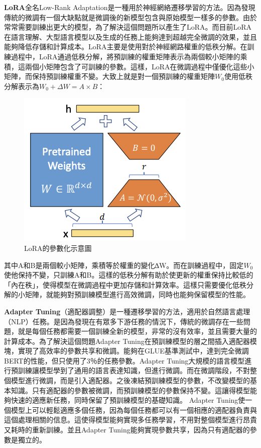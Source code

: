 \documentclass[8pt,a4paper,MingLiU,UTF8]{article}
\begin{document}
	\textbf{LoRA}全名Low-Rank Adaptation是一種用於神經網絡遷移學習的方法。因為發現傳統的微調有一個大缺點就是微調後的新模型包含與原始模型一樣多的參數。由於常常需要訓練出更大的模型，為了解決這個問題所以產生了LoRA。而目前LoRA在語言理解、大型語言模型以及生成的任務上能夠達到超越完全微調的效果，並且能夠降低存儲和計算成本。LoRA主要是使用對於神經網路權重的低秩分解。在訓練過程中，LoRA通過低秩分解，將預訓練的權重矩陣表示為兩個較小矩陣的乘積，這兩個小矩陣包含了可訓練的參數。這樣，LoRA在微調過程中僅優化這些小矩陣，而保持預訓練權重不變。大致上就是對一個預訓練的權重矩陣$W_0$使用低秩分解表示為$W_0+\Delta W=A×B$：
	\begin{figure}[H]
		\centering
	\includegraphics{20120468S5MbIQ5N0s}
	\caption{LoRA的參數化示意圖\protect\cite{hu2021lora}}
	\end{figure}
	其中A和B是兩個較小矩陣，乘積等於權重的變化∆W。而在訓練過程中，固定$W_0$使他保持不變，只訓練A和B。這樣的低秩分解有助於使更新的權重保持比較低的「內在秩」，使得模型在微調過程中更加存儲和計算效率。這樣只需要優化低秩分解的小矩陣，就能夠對預訓練模型進行高效微調，同時也能夠保留模型的性能。\cite{hu2021lora}

	\textbf{Adapter Tuning}（適配器調整）是一種遷移學習的方法，適用於自然語言處理（NLP）任務。是因為發現在有眾多下游任務的情況下，傳統的微調存在一些問題，就是每個任務都需要一個訓練全新的模型，非常的沒有效率，並且需要大量的計算成本。為了解決這個問題Adapter Tuning在預訓練模型的層之間插入適配器模塊，實現了高效率的參數共享和微調。能夠在GLUE基準測試中，達到完全微調BERT的性能，但只使用了3％的任務參數。Adapter Tuning大規模的語言模型進行預訓練讓模型學到了通用的語言表達知識，但進行微調。而在微調階段，不對整個模型進行微調，而是引入適配器。之後凍結預訓練模型的參數，不改變模型的基本知識。只有適配器的參數被微調，而預訓練模型的參數保持不變。這讓得模型能夠快速的適應新任務，同時保留了預訓練模型的基礎知識。
	Adapter Tuning使一個模型上可以輕鬆適應多個任務，因為每個任務都可以有一個相應的適配器負責與這個處理相關的信息。這使得模型能夠實現多任務學習，不用對整個模型進行昂貴又耗時的重新訓練。並且Adapter Tuning能夠實現參數共享，因為只有適配器的參數是獨立的。\cite{zhou2022efficiently}
\end{document}
